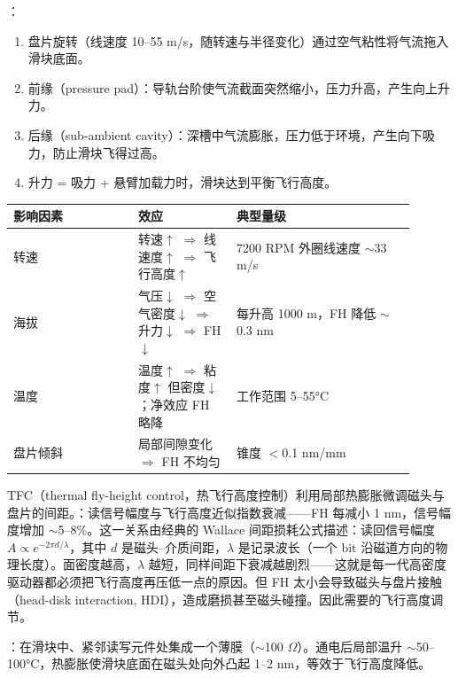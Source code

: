 ：
\begin{enumerate}
\item 盘片旋转（线速度 10--55 m/s，随转速与半径变化）通过空气粘性将气流拖入滑块底面。
\item 前缘（pressure pad）：导轨台阶使气流截面突然缩小，压力升高，产生向上升力。
\item 后缘（sub-ambient cavity）：深槽中气流膨胀，压力低于环境，产生向下吸力，防止滑块飞得过高。
\item 升力 = 吸力 + 悬臂加载力时，滑块达到平衡飞行高度。
\end{enumerate}

\begin{longtable}{L{0.28\linewidth}L{0.22\linewidth}L{0.4\linewidth}}
\toprule
影响因素 & 效应 & 典型量级 \\
\midrule
转速 & 转速$\uparrow$ $\Rightarrow$ 线速度$\uparrow$ $\Rightarrow$ 飞行高度$\uparrow$ & 7200 RPM 外圈线速度 $\sim$33 m/s \\\tablerowrule
海拔 & 气压$\downarrow$ $\Rightarrow$ 空气密度$\downarrow$ $\Rightarrow$ 升力$\downarrow$ $\Rightarrow$ FH$\downarrow$ & 每升高 1000 m，FH 降低 $\sim$0.3 nm \\\tablerowrule
温度 & 温度$\uparrow$ $\Rightarrow$ 粘度$\uparrow$ 但密度$\downarrow$；净效应 FH 略降 & 工作范围 5--55°C \\\tablerowrule
盘片倾斜 & 局部间隙变化 $\Rightarrow$ FH 不均匀 & 锥度 $<$0.1 nm/mm \\
\bottomrule
\end{longtable}


TFC（thermal fly-height control，热飞行高度控制）利用局部热膨胀微调磁头与盘片的间距。：读信号幅度与飞行高度近似指数衰减——FH 每减小 1 nm，信号幅度增加 $\sim$5--8\%。这一关系由经典的 Wallace 间距损耗公式描述：读回信号幅度 $A \propto e^{-2\pi d/\lambda}$，其中 $d$ 是磁头--介质间距，$\lambda$ 是记录波长（一个 bit 沿磁道方向的物理长度）。面密度越高，$\lambda$ 越短，同样间距下衰减越剧烈——这就是每一代高密度驱动器都必须把飞行高度再压低一点的原因。但 FH 太小会导致磁头与盘片接触（head-disk interaction, HDI），造成磨损甚至磁头碰撞。因此需要的飞行高度调节。

：在滑块中、紧邻读写元件处集成一个薄膜（$\sim$100 $\Omega$）。通电后局部温升 $\sim$50--100°C，热膨胀使滑块底面在磁头处向外凸起 1--2 nm，等效于飞行高度降低。

